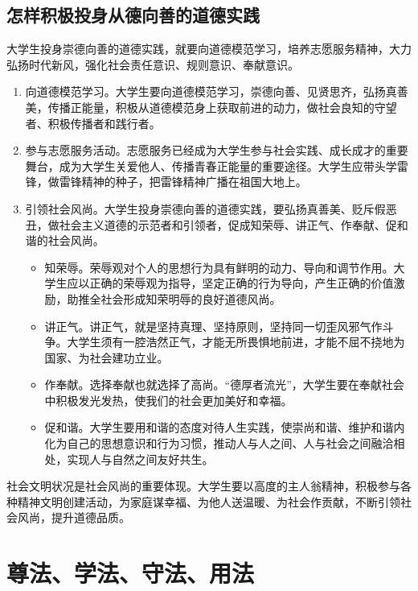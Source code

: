 \subsection{怎样积极投身从德向善的道德实践}
大学生投身崇德向善的道德实践，就要向道德模范学习，培养志愿服务精神，大力弘扬时代新风，强化社会责任意识、规则意识、奉献意识。
\begin{enumerate}
\item 向道德模范学习。大学生要向道德模范学习，崇德向善、见贤思齐，弘扬真善美，传播正能量，积极从道德模范身上获取前进的动力，做社会良知的守望者、积极传播者和践行者。
\item 参与志愿服务活动。志愿服务已经成为大学生参与社会实践、成长成才的重要舞台，成为大学生关爱他人、传播青春正能量的重要途径。大学生应带头学雷锋，做雷锋精神的种子，把雷锋精神广播在祖国大地上。
\item 引领社会风尚。大学生投身崇德向善的道德实践，要弘扬真善美、贬斥假恶丑，做社会主义道德的示范者和引领者，促成知荣辱、讲正气、作奉献、促和谐的社会风尚。
\begin{itemize}
\item 知荣辱。荣辱观对个人的思想行为具有鲜明的动力、导向和调节作用。大学生应以正确的荣辱观为指导，坚定正确的行为导向，产生正确的价值激励，助推全社会形成知荣明辱的良好道德风尚。
\item 讲正气。讲正气，就是坚持真理、坚持原则，坚持同一切歪风邪气作斗争。大学生须有一腔浩然正气，才能无所畏惧地前进，才能不屈不挠地为国家、为社会建功立业。
\item 作奉献。选择奉献也就选择了高尚。“德厚者流光”，大学生要在奉献社会中积极发光发热，使我们的社会更加美好和幸福。
\item 促和谐。大学生要用和谐的态度对待人生实践，使崇尚和谐、维护和谐内化为自己的思想意识和行为习惯，推动人与人之间、人与社会之间融洽相处，实现人与自然之间友好共生。
\end{itemize}
\end{enumerate}

社会文明状况是社会风尚的重要体现。大学生要以高度的主人翁精神，积极参与各种精神文明创建活动，为家庭谋幸福、为他人送温暖、为社会作贡献，不断引领社会风尚，提升道德品质。

\section{尊法、学法、守法、用法}

